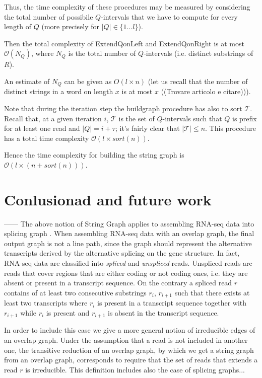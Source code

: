 \documentclass[runningheads,envcountsame,a4paper]{llncs}
\begin{document}
Thus, the time complexity of these procedures may be measured by considering the total number of possibile $Q$-intervals that we have to compute for every length of $Q$ (more precisely for $|Q| \in \{1 \dots l\}$).

Then the total  complexity of ExtendQonLeft and ExtendQonRight is at most $\mathcal{O}(N_Q)$, where $N_Q$ is the total number of $Q$-intervals (i.e. distinct substrings of $R$).

An estimate of $N_Q$ can be given as $O(l \times n)$ (let us recall that the number of distinct strings in a word on length $x$ is  at most $x$  ((Trovare articolo e citare))).

Note that during the iteration step the buildgraph procedure has also to sort $\mathcal{T}$. Recall that, at a given iteration $i$, $\mathcal{T}$ is the set of $Q$-intervals such that $Q$ is prefix for at least one read and $|Q| = i + \tau$; it's fairly clear that $|\mathcal{T}| \leq n$. This procedure has a total time complexity $\mathcal{O}(l \times sort(n))$.

Hence the time complexity for building the string graph is $\mathcal{O}(l \times (n + sort(n)))$. %



\section{Conlusionad and future work}
------
The above  notion of String Graph applies to   assembling RNA-seq data into splicing graph \cite{lavor nostro JCB}.
When assembling RNA-seq data with an overlap graph, the final output graph is not a line path, since the graph should represent the alternative transcripts derived by the alternative splicing
on the gene structure. In fact, RNA-seq data are classified into {\em spliced} and  {\em  unspliced} reads. Unspliced reads are reads that cover regions that are either coding or not coding ones, i.e. they are absent or present in a transcript sequence. On the contrary a  spliced read $r$ contains  of  at least two consecutive substrings   $r_i $, $r_{i+1}$ such that  there exists at least two transcripts where  $r_i$ is present in a transcript sequence  together with $r_{i+1}$ while $r_i$ is present and $r_{i+1}$ is absent in the transcript sequence.

In order to include this case we give a more general notion of irreducible edges of an overlap graph. Under the assumption that a read is not included in another one, the transitive reduction of an overlap graph, by which we get a string graph from an overlap graph, corresponds to require that the set of reads that extends a read $r$ is irreducible. This definition includes also the case of  splicing graphs...



\end{document}
